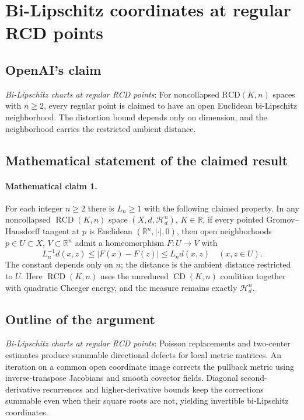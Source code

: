 \documentclass[11pt]{article}
\begin{document}
\section*{Bi-Lipschitz coordinates at regular RCD points}

\subsection{OpenAI's claim}
\textit{Bi-Lipschitz charts at regular RCD points}: For noncollapsed $\mathrm{RCD}(K,n)$ spaces with $n\ge2$, every regular point is claimed to have an open Euclidean bi-Lipschitz neighborhood. The distortion bound depends only on dimension, and the neighborhood carries the restricted ambient distance.

\subsection{Mathematical statement of the claimed result}
\paragraph{Mathematical claim 1.} For each integer $n\ge2$ there is $L_n\ge1$ with the following claimed property. In any noncollapsed $\operatorname{RCD}(K,n)$ space $(X,d,\mathcal H_d^n)$, $K\in\mathbb R$, if every pointed Gromov--Hausdorff tangent at $p$ is Euclidean $(\mathbb R^n,|\cdot|,0)$, then open neighborhoods $p\in U\subset X$, $V\subset\mathbb R^n$ admit a homeomorphism $F:U\to V$ with \[L_n^{-1}d(x,z)\le|F(x)-F(z)|\le L_nd(x,z)\quad(x,z\in U).\] The constant depends only on $n$; the distance is the ambient distance restricted to $U$. Here $\operatorname{RCD}(K,n)$ uses the unreduced $\operatorname{CD}(K,n)$ condition together with quadratic Cheeger energy, and the measure remains exactly $\mathcal H_d^n$.

\subsection{Outline of the argument}
\textit{Bi-Lipschitz charts at regular RCD points}: Poisson replacements and two-center estimates produce summable directional defects for local metric matrices. An iteration on a common open coordinate image corrects the pullback metric using inverse-transpose Jacobians and smooth covector fields. Diagonal second-derivative recurrences and higher-derivative bounds keep the corrections summable even when their square roots are not, yielding invertible bi-Lipschitz coordinates.
\end{document}
